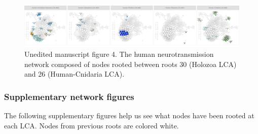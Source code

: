 \begin{Shaded}
\begin{Highlighting}[]
{{{\NormalTok{    ,} 
\NormalTok{    ,} 
\NormalTok{  ) }\OperatorTok{+}
\StringTok{  }\NormalTok{(} \NormalTok{(}\NormalTok{, }\NormalTok{)) }\OperatorTok{+}
\StringTok{  }\OperatorTok{~}\StringTok{ } \NormalTok{) }\OperatorTok{+}
\StringTok{  }
\end{Highlighting}
\end{Shaded}

\begin{figure}

{\centering \includegraphics{figs/analysis.network.fig4-1} 

}

\caption{Unedited manuscript figure 4. The human neurotransmission network composed of nodes rooted between roots 30 (Holozoa LCA) and 26 (Human-Cnidaria LCA).}\label{fig:fig4}
\end{figure}

\hypertarget{supplementary-network-figures}{%
\subsubsection{Supplementary network
figures}\label{supplementary-network-figures}}

The following supplementary figures help us see what nodes have been
rooted at each LCA. Nodes from previous roots are colored white.

